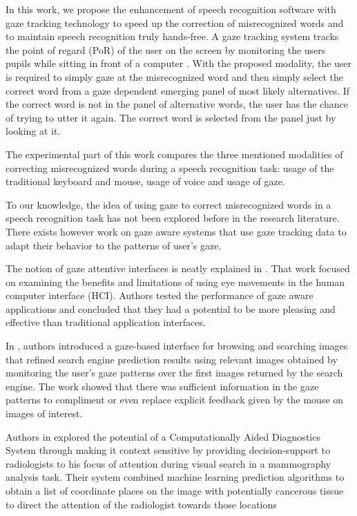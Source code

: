 \documentclass[]{article}
\begin{document}
 
In this work, we propose the enhancement of speech recognition software with gaze tracking technology to speed up the
correction of misrecognized words and to maintain speech recognition truly hands-free. A gaze tracking system tracks the
point of regard (PoR) of the user on the screen by monitoring the users pupils while sitting in front of a computer
\cite{Rozado2012a}. With the proposed modality, the user is required to simply gaze at the misrecognized word and then
simply select  the correct word from a gaze dependent emerging panel of most likely alternatives. If the correct word is
not in the panel of alternative words, the user has the chance of trying to utter it again. The correct word is selected
from the panel just by looking at it.


The experimental part of this work compares the three mentioned modalities of correcting misrecognized words during  a
speech recognition task: usage of the traditional keyboard and mouse, usage of voice and usage of gaze.


To our knowledge, the idea of using gaze to correct misrecognized words in a speech recognition task has not been 
explored before in the research literature. There exists however work on gaze aware systems that use gaze tracking data
to adapt their behavior to the patterns of user's gaze.


The notion of gaze attentive interfaces is neatly explained in \cite{hyrskykari2006eyes}. That work focused on examining
the benefits and limitations of using eye movements in the human computer interface (HCI). Authors tested 
the performance of gaze aware applications and concluded that they had a potential to be more
pleasing and effective than traditional application interfaces.

 
In \cite{Kozma2009}, authors introduced a gaze-based interface for browsing and searching images that refined search
engine prediction results using relevant images obtained by monitoring the user's gaze patterns over the first images
returned by the search engine. The work showed that there was sufficient information in the gaze patterns to compliment or even replace
explicit feedback given by the mouse on images of interest. 


Authors in \cite{Tourassi2010} explored the potential of a Computationally Aided Diagnostics System through making it
context sensitive by providing decision-support to radiologists to his focus of attention during visual search in a mammography
analysis task. Their system combined machine learning prediction algorithms to obtain a list of coordinate places on the
image with potentially cancerous tissue to direct the attention of the radiologist towards those locations
\end{document}
